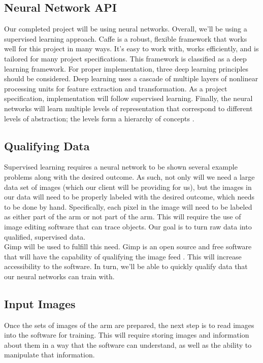 \documentclass[10pt,journal,compsoc, draftclsnofoot,onecolumn]{IEEEtran}
\begin{document}
\subsection{Neural Network API}
Our completed project will be using neural networks. Overall, we'll be using a supervised learning approach. Caffe \cite{3:online} is a robust, flexible framework that works well for this project in many ways. It's easy to work with, works efficiently, and is tailored for many project specifications. This framework is classified as a deep learning framework. For proper implementation, three deep learning principles should be considered. Deep learning uses a cascade of multiple layers of nonlinear processing units for feature extraction and transformation. As a project specification, implementation will follow supervised learning. Finally, the neural networks will learn multiple levels of representation that correspond to different levels of abstraction; the levels form a hierarchy of concepts \cite{deep_learning}.



\subsection{Qualifying Data}
Supervised learning requires a neural network to be shown several example problems along with the desired outcome. As such, not only will we need a large data set of images (which our client will be providing for us), but the images in our data will need to be properly labeled with the desired outcome, which needs to be done by hand. Specifically, each pixel in the image will need to be labeled as either part of the arm or not part of the arm. This will require the use of image editing software that can trace objects. Our goal is to turn raw data into qualified, supervised data. \\

\noindent Gimp will be used to fulfill this need. Gimp is an open source and free software that will have the capability of qualifying the image feed \cite{4:online}. This will increase accessibility to the software. In turn, we'll be able to quickly qualify data that our neural networks can train with.


\subsection{Input Images}
\noindent
Once the sets of images of the arm are prepared, the next step is to read images into the software for training. This will require storing images and information about them in a way that the software can understand, as well as the ability to manipulate that information. \\
\end{document}
